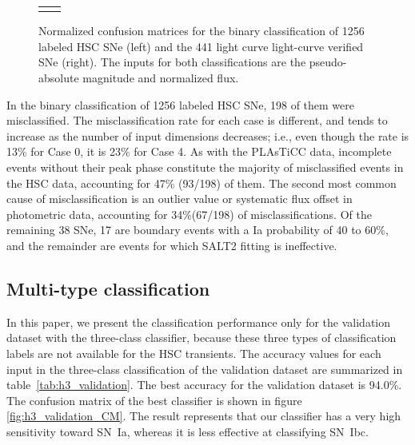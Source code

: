 \documentclass[proof]{pasj01}
\providecommand{\DIFadd}[1]{{\protect\color{blue} \sf #1}} %
\providecommand{\DIFdel}[1]{{\protect\color{red} \scriptsize #1}} %
\providecommand{\DIFaddFL}[1]{\DIFadd{#1}} %
\providecommand{\DIFdelFL}[1]{\DIFdel{#1}} %
\providecommand{\DIFaddbeginFL}{} %
\providecommand{\DIFaddendFL}{} %
\providecommand{\DIFdelbeginFL}{} %
\providecommand{\DIFdelendFL}{} %
\newcommand{\DIFscaledelfig}{0.5}
\newlength{\DIFdelgraphicswidth} %
\newlength{\DIFdelgraphicsheight} %
\newcommand{\DIFaddincludegraphics}[2][]{{\color{blue}\fbox{\DIFOincludegraphics[#1]{#2}}}} %
\newcommand{\DIFdelincludegraphics}[2][]{%
\sbox{\DIFdelgraphicsbox}{\DIFOincludegraphics[#1]{#2}}%
\settoboxwidth{\DIFdelgraphicswidth}{\DIFdelgraphicsbox} %
\settoboxtotalheight{\DIFdelgraphicsheight}{\DIFdelgraphicsbox} %
\scalebox{\DIFscaledelfig}{%
\parbox[b]{\DIFdelgraphicswidth}{\usebox{\DIFdelgraphicsbox}\\[-\baselineskip] \rule{\DIFdelgraphicswidth}{0em}}\llap{\resizebox{\DIFdelgraphicswidth}{\DIFdelgraphicsheight}{%
\setlength{\unitlength}{\DIFdelgraphicswidth}%
\begin{picture}(1,1)%
\thicklines\linethickness{2pt} %
{\color[rgb]{1,0,0}\put(0,0){\framebox(1,1){}}}%
{\color[rgb]{1,0,0}\put(0,0){\line( 1,1){1}}}%
{\color[rgb]{1,0,0}\put(0,1){\line(1,-1){1}}}%
\end{picture}%
}\hspace*{3pt}}} %
} %
\DeclareRobustCommand{\DIFaddbeginFL}{\DIFOaddbeginFL \let\includegraphics\DIFaddincludegraphics} %
\DeclareRobustCommand{\DIFaddendFL}{\DIFOaddendFL \let\includegraphics\DIFOincludegraphics} %
\DeclareRobustCommand{\DIFdelbeginFL}{\DIFOdelbeginFL \let\includegraphics\DIFdelincludegraphics} %
\DeclareRobustCommand{\DIFdelendFL}{\DIFOaddendFL \let\includegraphics\DIFOincludegraphics} %
\begin{document}
\begin{figure}[htbp]
\begin{tabular}{cc}
\begin{minipage}{0.5\hsize}
\begin{center}
            \end{center}
        \end{minipage}
    \end{tabular}
    \caption{%
  Normalized confusion matrices for the binary classification of 1256 labeled HSC SNe (left) and the 441 \DIFdelbeginFL \DIFdelFL{light curve }\DIFdelendFL \DIFaddbeginFL \DIFaddFL{light-curve }\DIFaddendFL verified SNe (right).
  The inputs for both classifications are the pseudo-absolute magnitude and normalized flux.
}%
    \label{fig:h2_test_CM}
\end{figure}
%

In the binary classification of 1256 labeled HSC SNe, 198 of them were misclassified.
The misclassification rate for each case is different, and tends to increase as the number of input dimensions decreases;
i.e., even though the rate is 13\% for Case 0, it is 23\% for Case 4.
As with the PLAsTiCC data, incomplete events without their peak phase constitute the majority of misclassified events in the HSC data, accounting for 47\% (93/198) of them.
The second most common cause of misclassification is an outlier value or systematic flux offset in photometric data, accounting for 34\%(67/198) of misclassifications.
Of the remaining 38 SNe, 17 are boundary events with a Ia probability of 40 to 60\%, and the remainder are events for which SALT2 fitting is ineffective.

%
%
\subsection{Multi-type classification}
\label{sec:h3}
%
In this paper, we present the classification performance only for the validation dataset with the three-class classifier, because these three types of classification labels are not available for the HSC transients.
The accuracy values for each input in the three-class classification of the validation dataset are summarized in table\ \ref{tab:h3_validation}.
The best accuracy for the validation dataset is 94.0\%.
The confusion matrix of the best classifier is shown in figure \ref{fig:h3_validation_CM}.
The result represents that our classifier has a very high sensitivity toward SN~Ia, whereas it is less effective at classifying SN~Ibc.
\end{document}
